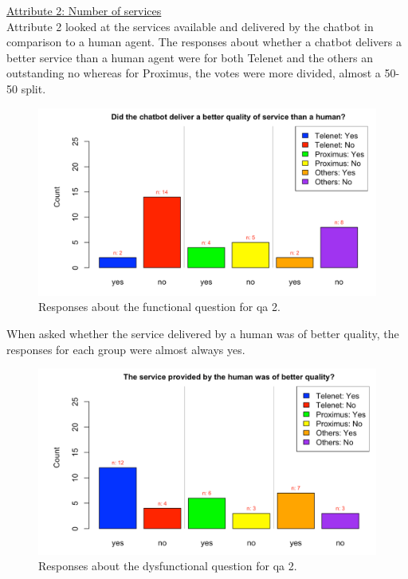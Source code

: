 \break
\ul{Attribute 2: Number of services}\\
\break
Attribute 2 looked at the services available and delivered by the chatbot in comparison to a human agent. The responses about whether a chatbot delivers a better service than a human agent were for both Telenet and the others an outstanding no whereas for Proximus, the votes were more divided, almost a 50-50 split.\\
\begin{figure}[!htb]
	\includegraphics[width=\linewidth, scale=0.5]{../LaTeX/Figures/Comparative/Q2.png}
	\caption{Responses about the functional question for \acrshort{qa} 2.}\label{fig:Q2}
\end{figure}
When asked whether the service delivered by a human was of better quality, the responses for each group were almost always yes.\\
\begin{figure}[!htb]
	\includegraphics[width=\linewidth, scale=0.5]{../LaTeX/Figures/Comparative/DQ2.png}
	\caption{Responses about the dysfunctional question for \acrshort{qa} 2.}\label{fig:DQ2}
\end{figure}
